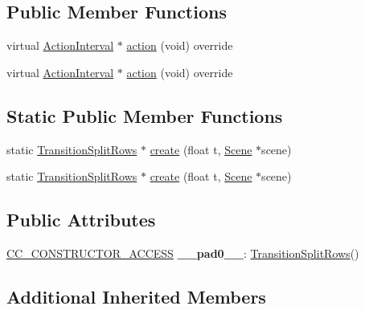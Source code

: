 \subsection*{Public Member Functions}
\begin{DoxyCompactItemize}
\item 
virtual \hyperlink{classActionInterval}{Action\+Interval} $\ast$ \hyperlink{classTransitionSplitRows_acd330cd9bde2c1fb7d3da21befa5918e}{action} (void) override
\item 
virtual \hyperlink{classActionInterval}{Action\+Interval} $\ast$ \hyperlink{classTransitionSplitRows_ac24473a717ed730485921a329dc9c5de}{action} (void) override
\end{DoxyCompactItemize}
\subsection*{Static Public Member Functions}
\begin{DoxyCompactItemize}
\item 
static \hyperlink{classTransitionSplitRows}{Transition\+Split\+Rows} $\ast$ \hyperlink{classTransitionSplitRows_a01cdd1c976378d9e053e261ca806c038}{create} (float t, \hyperlink{classScene}{Scene} $\ast$scene)
\item 
static \hyperlink{classTransitionSplitRows}{Transition\+Split\+Rows} $\ast$ \hyperlink{classTransitionSplitRows_a0f00f59d8827a1979ea032eb5173df87}{create} (float t, \hyperlink{classScene}{Scene} $\ast$scene)
\end{DoxyCompactItemize}
\subsection*{Public Attributes}
\begin{DoxyCompactItemize}
\item 
\mbox{\label{classTransitionSplitRows_a8fa2208782b5333fb57344fdd4302672}} 
\hyperlink{_2cocos2d_2cocos_2base_2ccConfig_8h_a25ef1314f97c35a2ed3d029b0ead6da0}{C\+C\+\_\+\+C\+O\+N\+S\+T\+R\+U\+C\+T\+O\+R\+\_\+\+A\+C\+C\+E\+SS} {\bfseries \+\_\+\+\_\+pad0\+\_\+\+\_\+}\+: \hyperlink{classTransitionSplitRows}{Transition\+Split\+Rows}()
\end{DoxyCompactItemize}
\subsection*{Additional Inherited Members}


